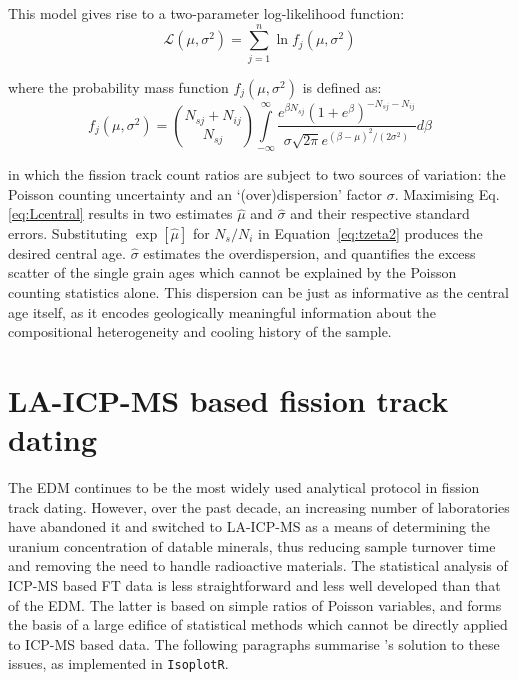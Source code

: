 \begin{refsection}
This model gives rise to a two-parameter log-likelihood function:
\begin{equation}
  \mathcal{L}(\mu,\sigma^2) = \sum\limits_{j=1}^{n}
  \ln f_j(\mu,\sigma^2)
\label{eq:Lcentral}
\end{equation}

\noindent where the probability mass function $f_j(\mu,\sigma^2)$ is
defined as:
\begin{equation}
  f_j(\mu,\sigma^2) = {{N_{sj}+N_{ij}}\choose{N_{sj}}}
  \int\limits_{-\infty}^{\infty} \frac{e^{\beta N_{sj}} \left( 1 +
    e^\beta \right)^{-N_{sj}-N_{ij}}} {\sigma\sqrt{2\pi}
    e^{(\beta-\mu)^2/(2\sigma^2)}} d\beta
  \label{eq:fjms}
\end{equation}

\noindent in which the fission track count ratios are subject to two
sources of variation: the Poisson counting uncertainty and an
`(over)dispersion' factor $\sigma$.  Maximising Eq. \ref{eq:Lcentral}
results in two estimates $\hat{\mu}$ and $\hat{\sigma}$ and their
respective standard errors.  Substituting $\exp[\hat{\mu}]$ for
$N_s/N_i$ in Equation~\ref{eq:tzeta2} produces the desired central
age. $\hat{\sigma}$ estimates the overdispersion, and quantifies the
excess scatter of the single grain ages which cannot be explained by
the Poisson counting statistics alone. This dispersion can be just as
informative as the central age itself, as it encodes geologically
meaningful information about the compositional heterogeneity and
cooling history of the sample.

\section{LA-ICP-MS based fission track dating}
\label{sec:ICPFT}

The EDM continues to be the most widely used analytical protocol in
fission track dating. However, over the past decade, an increasing
number of laboratories have abandoned it and switched to LA-ICP-MS as
a means of determining the uranium concentration of datable minerals,
thus reducing sample turnover time and removing the need to handle
radioactive materials\citep{hasebe2004, chew2012, vermeesch2017}. The
statistical analysis of ICP-MS based FT data is less straightforward
and less well developed than that of the EDM. The latter is based on
simple ratios of Poisson variables, and forms the basis of a large
edifice of statistical methods which cannot be directly applied to
ICP-MS based data. The following paragraphs summarise
\citet{vermeesch2017}'s solution to these issues, as implemented in
\texttt{IsoplotR}.\\


\end{refsection}
